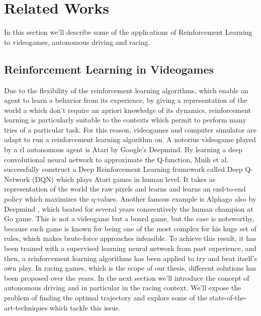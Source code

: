 \section{Related Works}



In this section we'll describe some of the applications of Reinforcement Learning to videogames, autonomous driving and racing. 


\subsection{Reinforcement Learning in Videogames}

Due to the flexibility of the reinforcement learning algorithms, which enable an agent to learn a behavior from its experience, by giving a representation of the world a which don't require an apriori knowledge of its dynamics, reinforcement learning is particularly suitable to the contexts which permit to perform many tries of a particular task. For this reason, videogames and computer simulator are adapt to run a reinforcement learning algorithm on.
A notorius videogame played by a rl autonomous agent is Atari \cite{atari} by Google's Deepmind. By learning a deep convolutional neural network to approximate the Q-function, Mnih et al. successfully construct a Deep Reinforcement Learning framework called Deep Q-Network (DQN) which plays Atari games in human level. It takes as representation of the world the raw pixels and learns and learns an end-to-end policy which maximizes the q-values.
Another famous example is Alphago also by Deepmind \cite{alphago}, which beated for several years consecutively the human champion at Go game. This is not a videogame but a board game, but the case is noteworthy, because such game is known for being one of the most complex  for his huge set of rules, which makes brute-force approaches infeasible. To achieve this result, it has been trained with a supervised learning neural network from past experience, and then, a reinforcement learning algorithms has been applied to try and beat itself's own play. 
In racing games, which is the scope of our thesis, different solutions has been proposed over the years. In the next section we'll introduce the concept of autonomous driving and in particular in the racing context. We'll expose the problem of finding the optimal trajectory and explore some of the state-of-the-art-techniques which tackle this issue.


